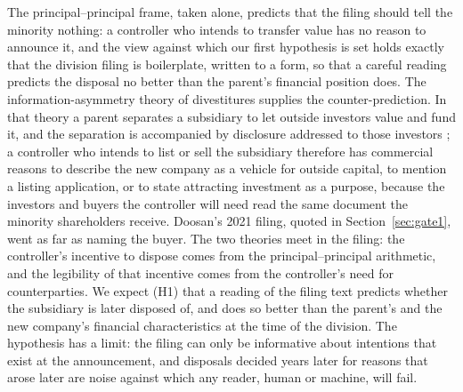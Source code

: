 The principal--principal frame, taken alone, predicts that the filing should tell the minority nothing: a controller who intends to transfer value has no reason to announce it, and the view against which our first hypothesis is set holds exactly that the division filing is boilerplate, written to a form, so that a careful reading predicts the disposal no better than the parent's financial position does. The information-asymmetry theory of divestitures supplies the counter-prediction. In that theory a parent separates a subsidiary to let outside investors value and fund it, and the separation is accompanied by disclosure addressed to those investors \cite{nanda1991, krishnaswami1999}; a controller who intends to list or sell the subsidiary therefore has commercial reasons to describe the new company as a vehicle for outside capital, to mention a listing application, or to state attracting investment as a purpose, because the investors and buyers the controller will need read the same document the minority shareholders receive. Doosan's 2021 filing, quoted in Section~\ref{sec:gate1}, went as far as naming the buyer. The two theories meet in the filing: the controller's incentive to dispose comes from the principal--principal arithmetic, and the legibility of that incentive comes from the controller's need for counterparties. We expect (H1) that a reading of the filing text predicts whether the subsidiary is later disposed of, and does so better than the parent's and the new company's financial characteristics at the time of the division. The hypothesis has a limit: the filing can only be informative about intentions that exist at the announcement, and disposals decided years later for reasons that arose later are noise against which any reader, human or machine, will fail.

